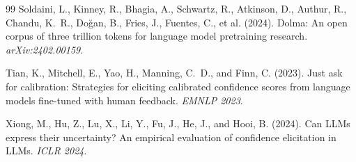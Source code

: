 \documentclass[11pt]{article}
\begin{document}
\begin{thebibliography}{99}
Soldaini, L., Kinney, R., Bhagia, A., Schwartz, R., Atkinson, D., Authur, R., Chandu, K.~R., Do\u{g}an, B., Fries, J., Fuentes, C., et al. (2024).
Dolma: An open corpus of three trillion tokens for language model pretraining research.
\textit{arXiv:2402.00159}.

Tian, K., Mitchell, E., Yao, H., Manning, C.~D., and Finn, C. (2023).
Just ask for calibration: Strategies for eliciting calibrated confidence scores from language models fine-tuned with human feedback.
\textit{EMNLP 2023}.

Xiong, M., Hu, Z., Lu, X., Li, Y., Fu, J., He, J., and Hooi, B. (2024).
Can LLMs express their uncertainty? An empirical evaluation of confidence elicitation in LLMs.
\textit{ICLR 2024}.

\end{thebibliography}
\end{document}
